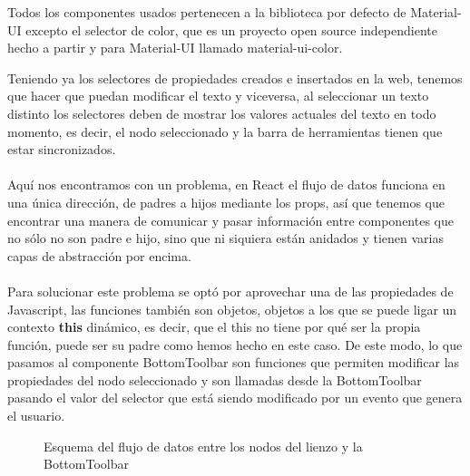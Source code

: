 Todos los componentes usados pertenecen a la biblioteca por defecto de Material-UI excepto el
selector de color, que es un proyecto open source independiente hecho a partir y para Material-UI
llamado material-ui-color\cite{material-ui-color}.

\newpage

Teniendo ya los selectores de propiedades creados e insertados en la web, tenemos que hacer
que puedan modificar el texto y viceversa, al seleccionar un texto distinto los selectores 
deben de mostrar los valores actuales del texto en todo momento, es decir, el nodo seleccionado
y la barra de herramientas tienen que estar sincronizados.
\\\\
Aquí nos encontramos con un problema, en React el flujo de datos funciona en una única dirección,
de padres a hijos mediante los props, así que tenemos que encontrar una manera de comunicar y
pasar información entre componentes que no sólo no son padre e hijo, sino que ni siquiera están
anidados y tienen varias capas de abstracción por encima.
\\\\
Para solucionar este problema se optó por aprovechar una de las propiedades de Javascript, 
las funciones también son objetos, objetos a los que se puede ligar un contexto \textbf{this}
dinámico, es decir, que el this no tiene por qué ser la propia función, puede ser su padre como
hemos hecho en este caso.
De este modo, lo que pasamos al componente BottomToolbar son funciones que permiten modificar
las propiedades del nodo seleccionado y son llamadas desde la BottomToolbar pasando el valor 
del selector que está siendo modificado por un evento que genera el usuario.

\begin{figure}[!h]
  \centering
  \noindent{}
  \caption{Esquema del flujo de datos entre los nodos del lienzo y la BottomToolbar}
\end{figure}

